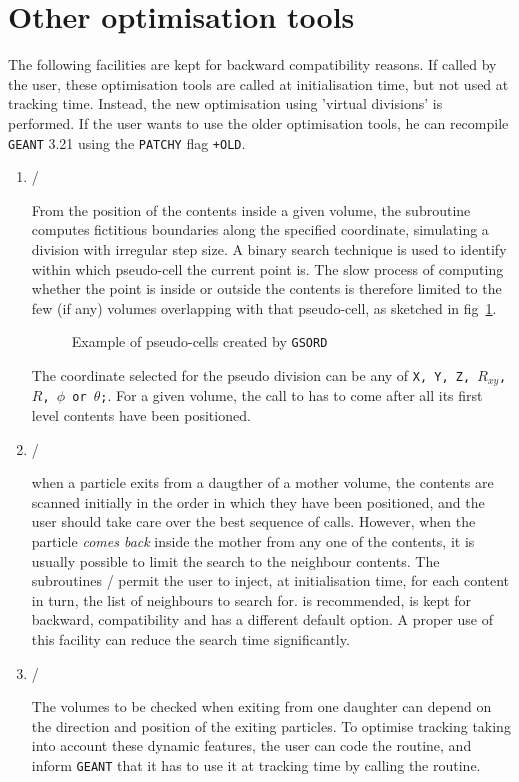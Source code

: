 \section{ Other optimisation tools}

The following facilities are kept for backward compatibility reasons.
If called by the user, these optimisation tools are called at 
initialisation time, but not used at tracking time. Instead, the
new optimisation using 'virtual divisions' is performed.
If the user wants to use the older optimisation tools, he can 
recompile {\tt GEANT} 3.21 using the {\tt PATCHY} flag {\tt +OLD}.
\begin{enumerate}
\item {}/

From the position of the contents inside a given volume, the
subroutine  computes fictitious
boundaries along the specified coordinate, simulating
a division with irregular step size. A binary search technique is used
to identify within which pseudo-cell the current point is. The slow process
of computing whether the point is inside or outside the contents is therefore
limited to the few (if any) volumes overlapping with that
pseudo-cell, as sketched in fig~\ref{fg:geom001-2}.

\begin{figure}[hbt]
      \centering
      \caption{Example of pseudo-cells created by {\tt GSORD}}
      \label{fg:geom001-2}
\end{figure}

The coordinate selected for the pseudo division can be any of
{\tt X, Y, Z, $R_{xy}$, $R$, $\phi$ or $\theta$;}.
For a given volume, the call to  has to come after all its first
level contents have been positioned.

\item
{}/

when a particle exits from a daugther of a 
mother volume, the contents are scanned initially
in the order in which 
they have been positioned, and the user should take care over
the best sequence of  calls. However, when the particle
{\it  comes back}
inside the mother from any one of the contents, it is
usually possible to limit the search to the neighbour contents.
The subroutines / permit the user to inject, at
initialisation time, for each content
in turn, the list of neighbours to search for.
 is recommended,  is kept for backward,
compatibility and has a different default option. A proper use of this
facility can reduce the search time significantly.

\item {}/

The volumes to be checked when exiting from one daughter can depend on 
the direction and position of the exiting particles. To optimise tracking
taking into account these dynamic features, the user can code the
 routine, and inform {\tt GEANT} that it has to use it
at tracking time by calling the  routine.
\end{enumerate}

